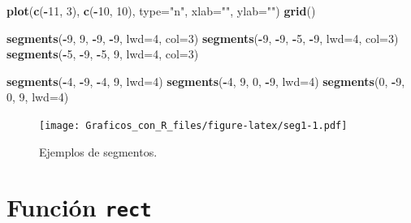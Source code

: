 \documentclass[10pt,]{krantz}
\makeatletter
\newenvironment{Shaded}{\begin{snugshade}}{\end{snugshade}}
\newcommand{\KeywordTok}[1]{\textcolor[rgb]{0.13,0.29,0.53}{\textbf{#1}}}
\newcommand{\DataTypeTok}[1]{\textcolor[rgb]{0.13,0.29,0.53}{#1}}
\newcommand{\DecValTok}[1]{\textcolor[rgb]{0.00,0.00,0.81}{#1}}
\newcommand{\StringTok}[1]{\textcolor[rgb]{0.31,0.60,0.02}{#1}}
\newcommand{\OperatorTok}[1]{\textcolor[rgb]{0.81,0.36,0.00}{\textbf{#1}}}
\newcommand{\NormalTok}[1]{#1}
\newenvironment{kframe}{%
\medskip{}
\setlength{\fboxsep}{.8em}
 \def\at@end@of@kframe{}%
 \ifinner\ifhmode%
  \def\at@end@of@kframe{\end{minipage}}%
  \begin{minipage}{\columnwidth}%
 \fi\fi%
 \def\FrameCommand##1{\hskip\@totalleftmargin \hskip-\fboxsep
 \colorbox{shadecolor}{##1}\hskip-\fboxsep
     \hskip-\linewidth \hskip-\@totalleftmargin \hskip\columnwidth}%
 \MakeFramed {\advance\hsize-\width
   \@totalleftmargin\z@ \linewidth\hsize
   \@setminipage}}%
 {\par\unskip\endMakeFramed%
 \at@end@of@kframe}
\renewenvironment{Shaded}{\begin{kframe}}{\end{kframe}}
\makeatother
\begin{document}
\begin{Shaded}
\begin{Highlighting}[]
\KeywordTok{plot}\NormalTok{(}\KeywordTok{c}\NormalTok{(}\OperatorTok{-}\DecValTok{11}\NormalTok{, }\DecValTok{3}\NormalTok{), }\KeywordTok{c}\NormalTok{(}\OperatorTok{-}\DecValTok{10}\NormalTok{, }\DecValTok{10}\NormalTok{), }\DataTypeTok{type=}\StringTok{"n"}\NormalTok{, }\DataTypeTok{xlab=}\StringTok{""}\NormalTok{, }\DataTypeTok{ylab=}\StringTok{""}\NormalTok{)}
\KeywordTok{grid}\NormalTok{()}

\KeywordTok{segments}\NormalTok{(}\OperatorTok{-}\DecValTok{9}\NormalTok{, }\DecValTok{9}\NormalTok{, }\OperatorTok{-}\DecValTok{9}\NormalTok{, }\OperatorTok{-}\DecValTok{9}\NormalTok{, }\DataTypeTok{lwd=}\DecValTok{4}\NormalTok{, }\DataTypeTok{col=}\DecValTok{3}\NormalTok{)}
\KeywordTok{segments}\NormalTok{(}\OperatorTok{-}\DecValTok{9}\NormalTok{, }\OperatorTok{-}\DecValTok{9}\NormalTok{, }\OperatorTok{-}\DecValTok{5}\NormalTok{, }\OperatorTok{-}\DecValTok{9}\NormalTok{, }\DataTypeTok{lwd=}\DecValTok{4}\NormalTok{, }\DataTypeTok{col=}\DecValTok{3}\NormalTok{)}
\KeywordTok{segments}\NormalTok{(}\OperatorTok{-}\DecValTok{5}\NormalTok{, }\OperatorTok{-}\DecValTok{9}\NormalTok{, }\OperatorTok{-}\DecValTok{5}\NormalTok{, }\DecValTok{9}\NormalTok{, }\DataTypeTok{lwd=}\DecValTok{4}\NormalTok{, }\DataTypeTok{col=}\DecValTok{3}\NormalTok{)}

\KeywordTok{segments}\NormalTok{(}\OperatorTok{-}\DecValTok{4}\NormalTok{, }\OperatorTok{-}\DecValTok{9}\NormalTok{, }\OperatorTok{-}\DecValTok{4}\NormalTok{, }\DecValTok{9}\NormalTok{, }\DataTypeTok{lwd=}\DecValTok{4}\NormalTok{)}
\KeywordTok{segments}\NormalTok{(}\OperatorTok{-}\DecValTok{4}\NormalTok{, }\DecValTok{9}\NormalTok{, }\DecValTok{0}\NormalTok{, }\OperatorTok{-}\DecValTok{9}\NormalTok{, }\DataTypeTok{lwd=}\DecValTok{4}\NormalTok{)}
\KeywordTok{segments}\NormalTok{(}\DecValTok{0}\NormalTok{, }\OperatorTok{-}\DecValTok{9}\NormalTok{, }\DecValTok{0}\NormalTok{, }\DecValTok{9}\NormalTok{, }\DataTypeTok{lwd=}\DecValTok{4}\NormalTok{)}
\end{Highlighting}
\end{Shaded}

\begin{figure}
\centering
\texttt{[image: Graficos\_con\_R\_files/figure-latex/seg1-1.pdf]}
\caption{\label{fig:seg1}Ejemplos de segmentos.}
\end{figure}

\section{\texorpdfstring{Función \texttt{rect} 
}{Función rect  }}\label{funcion-rect}
\end{document}
